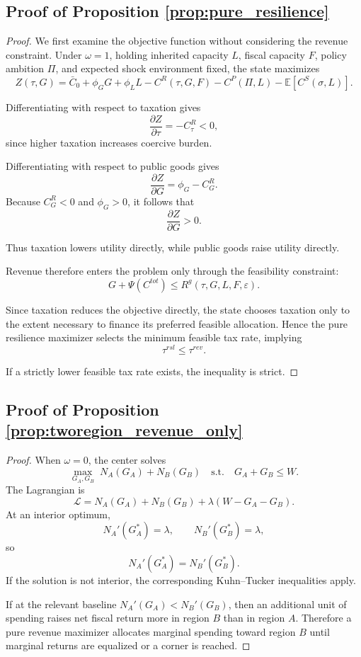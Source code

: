 \documentclass[12pt]{article}
\newcommand{\E}{\mathbb{E}}
\begin{document}
\subsection{Proof of Proposition \ref{prop:pure_resilience}}

\begin{proof}
We first examine the objective function without considering the revenue constraint. Under $\omega=1$, holding inherited capacity $L$, fiscal capacity $F$, policy ambition $\Pi$, and expected shock environment fixed, the state maximizes
\[
Z(\tau,G)=\bar C_0 + \phi_G G + \phi_L L - C^R(\tau,G,F) - C^P(\Pi,L) - \E[C^S(\sigma,L)].
\]

Differentiating with respect to taxation gives
\[
\frac{\partial Z}{\partial \tau}=-C^R_\tau<0,
\]
since higher taxation increases coercive burden.

Differentiating with respect to public goods gives
\[
\frac{\partial Z}{\partial G}=\phi_G-C^R_G.
\]
Because $C^R_G<0$ and $\phi_G>0$, it follows that
\[
\frac{\partial Z}{\partial G}>0.
\]

Thus taxation lowers utility directly, while public goods raise utility directly.

Revenue therefore enters the problem only through the feasibility constraint:
\[
G+\Psi(C^{tot}) \le R^g(\tau,G,L,F,\varepsilon).
\]

Since taxation reduces the objective directly, the state chooses taxation only to the extent necessary to finance its preferred feasible allocation. Hence the pure resilience maximizer selects the minimum feasible tax rate, implying
\[
\tau^{rsl}\le \tau^{rev}.
\]

If a strictly lower feasible tax rate exists, the inequality is strict.
\end{proof}




\subsection{Proof of Proposition \ref{prop:tworegion_revenue_only}}

\begin{proof}
When $\omega=0$, the center solves
\[
\max_{G_A,G_B} \; N_A(G_A)+N_B(G_B)
\quad \text{s.t.} \quad G_A+G_B\le W.
\]
The Lagrangian is
\[
\mathcal L = N_A(G_A)+N_B(G_B)+\lambda(W-G_A-G_B).
\]
At an interior optimum,
\[
N_A'(G_A^*)=\lambda,\qquad N_B'(G_B^*)=\lambda,
\]
so
\[
N_A'(G_A^*)=N_B'(G_B^*).
\]
If the solution is not interior, the corresponding Kuhn--Tucker inequalities apply.

If at the relevant baseline $N_A'(G_A)<N_B'(G_B)$, then an additional unit of spending raises net fiscal return more in region $B$ than in region $A$. Therefore a pure revenue maximizer allocates marginal spending toward region $B$ until marginal returns are equalized or a corner is reached.
\end{proof}
\end{document}
